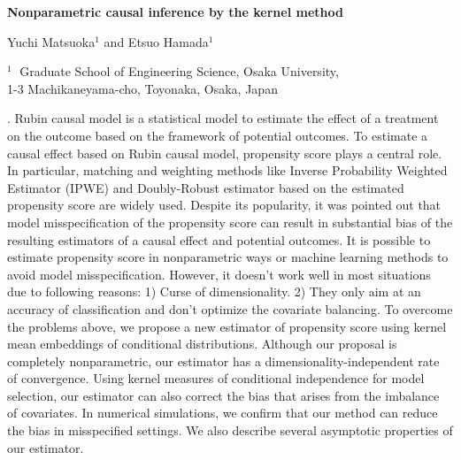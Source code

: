 \documentclass[12pt]{article}
\begin{document}
\begin{flushleft}


{\LARGE\bf Nonparametric causal inference by the kernel method}


\vspace{1.0cm}

Yuchi Matsuoka$^1$ and Etsuo Hamada$^1$

\begin{description}

\item $^1 \;$ Graduate School of Engineering Science, Osaka University,\\
1-3 Machikaneyama-cho, Toyonaka, Osaka, Japan


\end{description}

\end{flushleft}


\vspace{0.75cm}



. 
Rubin causal model is a statistical model to estimate the effect of a treatment on the outcome based on the framework of potential outcomes. To estimate a causal effect based on Rubin causal model, propensity score plays a central role. In particular, matching and weighting methods like Inverse Probability Weighted Estimator (IPWE) and Doubly-Robust estimator based on the estimated propensity score are widely used. Despite its popularity, it was pointed out that model misspecification of the propensity score can result in substantial bias of the resulting estimators of a causal effect and potential outcomes. It is possible to estimate propensity score in nonparametric ways or machine learning methods to avoid model misspecification. However, it doesn't work well in most situations due to following reasons: 1) Curse of dimensionality. 2) They only aim at an accuracy of classification and don't optimize the covariate balancing. To overcome the problems above, we propose a new estimator of propensity score using kernel mean embeddings of conditional distributions. Although our proposal is completely nonparametric, our estimator has a dimensionality-independent rate of convergence. Using kernel measures of conditional independence for model selection, our estimator can also correct the bias that arises from the imbalance of covariates. In numerical simulations, we confirm that our method can reduce the bias in misspecified settings. We also describe several asymptotic properties of our estimator. 
\end{document}
